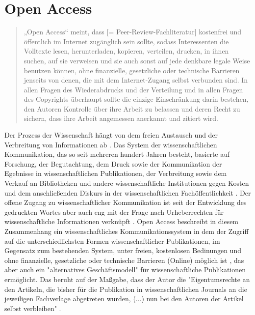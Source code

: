 \section{Open Access} 

\begin{quote}
„Open Access“ meint, dass [= Peer-Review-Fachliteratur] kostenfrei und öffentlich im Internet zugänglich sein sollte, sodass Interessenten die Volltexte lesen, herunterladen, kopieren, verteilen, drucken, in ihnen suchen, auf sie verweisen und sie auch sonst auf jede denkbare legale Weise benutzen können, ohne finanzielle, gesetzliche oder technische Barrieren jenseits von denen, die mit dem Internet-Zugang selbst verbunden sind. In allen Fragen des Wiederabdrucks und der Verteilung und in allen Fragen des Copyrights überhaupt sollte die einzige Einschränkung darin bestehen, den Autoren Kontrolle über ihre Arbeit zu belassen und deren Recht zu sichern, dass ihre Arbeit angemessen anerkannt und zitiert wird.
\cite{boai_2012}
\end{quote}
Der Prozess der Wissenschaft hängt von dem freien Austausch und der Verbreitung von Informationen ab \cite{cite:11}. Das System der wissenschaftlichen Kommunikation, das so seit mehreren hundert Jahren besteht, basierte auf Forschung, der Begutachtung, dem Druck sowie der Kommunikation der Egebnisse in wissenschaftlichen Publikationen, der Verbreitung sowie dem Verkauf an Bibliotheken und andere wissenschaftliche Institutionen gegen Kosten \cite{cite:11a} und dem anschließenden Diskurs in der wissenschaftlichen Fachöffentlichkeit \cite{suchen}. Der offene Zugang zu wissenschaftlicher Kommunikation ist seit der Entwicklung des gedruckten Wortes aber auch eng mit der Frage nach Urheberrechten für wissenschaftliche Informationen verknüpft \cite{Case_2000}. Open Access beschreibt in diesem Zusammenhang ein wissenschaftliches Kommunikationssystem in dem der Zugriff auf die unterschiedlichsten Formen wissenschaftlicher Publikationen, im Gegensatz zum bestehenden System, unter freien, kostenlosen Bedinungen und ohne finanzielle, gesetzliche oder technische Barrieren (Online) möglich ist \cite{WD_bundestag_2009}, das aber auch ein "alternatives Geschäftsmodell"\cite{lewis_2012_inevitability} für wissenschaftliche Publikationen ermöglicht. Das beruht auf der Maßgabe, dass der Autor die "Eigentumsrechte an den Artikeln, die bisher für die Publikation in wissenschaftlichen Journals an die jeweiligen Fachverlage abgetreten wurden, (...) nun bei den Autoren der Artikel selbst verbleiben" \cite{Hess_2006}. 

